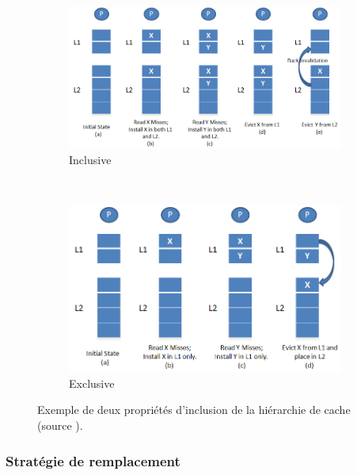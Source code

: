\begin{figure}
    \centering
    \begin{subfigure}[b]{0.45\linewidth}
        \includegraphics[width=\linewidth]{images/InclusivePolicy.png}
        \caption{Inclusive}
        \label{pic:InclusivePolicy}
    \end{subfigure}
    ~ %
    \begin{subfigure}[b]{0.45\linewidth}
        \includegraphics[width=0.85\linewidth]{images/ExclusivePolicy.png}
        \caption{Exclusive}
        \label{pic:ExclusivePolicy}
    \end{subfigure}
    \caption{Exemple de deux propriétés d'inclusion de la hiérarchie de cache (source \cite{wikipedia_2019}). }\label{fig:cacheinclusionpolicy}
\end{figure}





\subsubsection{Stratégie de remplacement}







